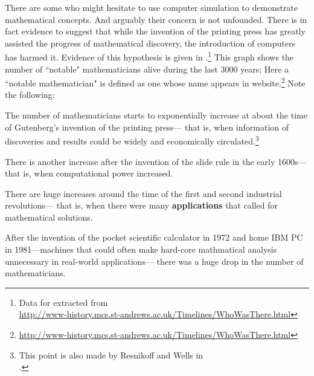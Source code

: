 There are some who might hesitate to use computer simulation to demonstrate mathematical concepts.
And arguably their concern is not unfounded.
There is in fact evidence to suggest that while the invention of the printing press has greatly 
assisted the progress of mathematical discovery, the introduction of computers has harmed it.
Evidence of this hypothesis is given in 
.\footnote{Data for  extracted from \\
  \url{http://www-history.mcs.st-andrews.ac.uk/Timelines/WhoWasThere.html}}
This graph shows the number of ``notable" mathematicians alive during the last 3000 years;
Here a ``notable mathematician" is defined as one whose name appears
in   
website.\footnote{\url{http://www-history.mcs.st-andrews.ac.uk/Timelines/WhoWasThere.html}}
Note the following:
\begin{liste}

\item The number of mathematicians starts to exponentially increase at 
about the time of Gutenberg's invention of the printing press---
that is, when information of discoveries and results could be widely and economically 
circulated.\footnote{This point is also made by Resnikoff and Wells in\\
.}

\item There is another increase after the invention of the slide rule in the early 1600s---
that is, when computational power increased.

\item There are huge increases around the time of the first and second industrial revolutions---
that is, when there were many {\bf applications} that called for mathematical solutions.

\item After the invention of the pocket scientific calculator in 1972 
and home IBM PC in 1981---machines that could 
often make hard-core mathmatical analysis unnecessary in real-world applications---
there was a huge drop in the number of mathematicians.

\end{liste}





